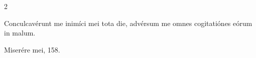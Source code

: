 \documentclass[9pt,twoside]{extarticle}
\begin{document}
\begin{multicols}{2}
%
%
%
%
%
%
%
%

\begin{tightlist}{}
\item {} Conculcavérunt me inimíci mei tota die, advérsum me omnes cogitatiónes eórum in malum.
\item {} Miserére mei, 158.
\end{tightlist}

%
%
%
%
%
%
%
%
%
%
%
%
%
%


\end{multicols}
\end{document}
